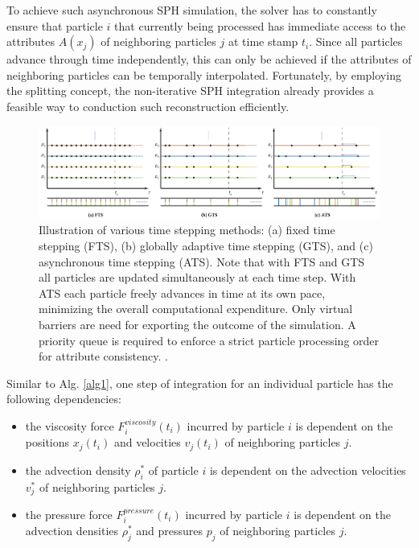\documentclass[
	11pt, 
	DIV10,
	ngerman,
	a4paper, 
	oneside, 
	headings=normal, 
	captions=tableheading,
	final, 
	numbers=noenddot
]{scrartcl}
\begin{document}
To achieve such asynchronous SPH simulation, the solver has to constantly ensure that particle $ i $ that currently being processed has immediate access to the attributes $ A(x_{j}) $ of neighboring particles $ j $ at time stamp $ t_{i} $. Since all particles advance through time independently, this can only be achieved if the attributes of neighboring particles can be temporally interpolated. Fortunately, by employing the splitting concept, the non-iterative SPH integration already provides a feasible way to conduction such reconstruction efficiently.

\begin{figure}[tb]
	\centering
	\includegraphics[scale=0.16]{images/4}
	\caption{\label{fig3} Illustration of various time stepping methods: (a) fixed time stepping (FTS), (b) globally adaptive time stepping (GTS), and (c) asynchronous time stepping (ATS). Note that with FTS and GTS all particles are updated simultaneously at each time step. With ATS each particle freely advances in time at its own pace, minimizing the overall computational expenditure. Only virtual barriers are need for exporting the outcome of the simulation. A priority queue is required to enforce a strict particle processing order for attribute consistency. \cite{reinhardt2017fully}.}
\end{figure}

\par
Similar to Alg. \ref{alg1}, one step of integration for an individual particle has the following dependencies:

\begin{itemize}
    \item the viscosity force $ F_{i}^{viscosity}(t_{i}) $ incurred by particle $i$ is dependent on the positions $ x_{j}(t_{i}) $ and velocities $ v_{j}(t_{i}) $ of neighboring particles $j$.
    \item the advection density $ \rho_{i}^{*} $ of particle $i$ is dependent on the advection velocities $ v_{j}^{*} $ of neighboring particles $j$.
    \item the pressure force $ F_{i}^{pressure}(t_{i}) $ incurred by particle $i$ is dependent on the advection densities $ \rho_{j}^{*} $ and pressures $ p_{j} $ of neighboring particles $j$.
\end{itemize}
\end{document}
